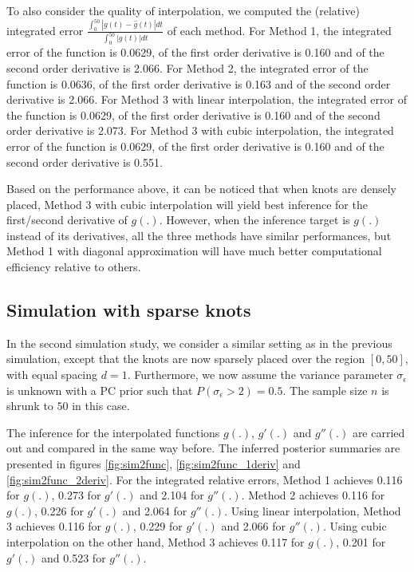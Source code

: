 \documentclass{article}
\begin{document}
To also consider the quality of interpolation, we computed the (relative) integrated error $\frac{\int_0^{50} |g(t) - \hat{g}(t)| dt}{\int_0^{50} |g(t)| dt}$ of each method. For Method 1, the integrated error of the function is 0.0629, of the first order derivative is 0.160 and of the second order derivative is 2.066. For Method 2, the integrated error of the function is 0.0636, of the first order derivative is 0.163 and of the second order derivative is 2.066. For Method 3 with linear interpolation, the integrated error of the function is 0.0629, of the first order derivative is 0.160 and of the second order derivative is 2.073. For Method 3 with cubic interpolation, the integrated error of the function is 0.0629, of the first order derivative is 0.160 and of the second order derivative is 0.551. 

Based on the performance above, it can be noticed that when knots are densely placed, Method 3 with cubic interpolation will yield best inference for the first/second derivative of $g(.)$. However, when the inference target is $g(.)$ instead of its derivatives, all the three methods have similar performances, but Method 1 with diagonal approximation will have much better computational efficiency relative to others.




\subsection{Simulation with sparse knots}

In the second simulation study, we consider a similar setting as in the previous simulation, except that the knots are now sparsely placed over the region $[0,50]$, with equal spacing $d = 1$. Furthermore, we now assume the variance parameter $\sigma_\epsilon$ is unknown with a PC prior such that $P(\sigma_\epsilon > 2) = 0.5$. The sample size $n$ is shrunk to $50$ in this case. 

The inference for the interpolated functions $g(.)$, $g'(.)$ and $g''(.)$ are carried out and compared in the same way before. The inferred posterior summaries are presented in figures \ref{fig:sim2func}, \ref{fig:sim2func_1deriv} and \ref{fig:sim2func_2deriv}. For the integrated relative errors, Method 1 achieves 0.116 for $g(.)$, 0.273 for $g'(.)$ and 2.104 for $g''(.)$. Method 2 achieves 0.116 for $g(.)$, 0.226 for $g'(.)$ and 2.064 for $g''(.)$. Using linear interpolation, Method 3 achieves 0.116 for $g(.)$, 0.229 for $g'(.)$ and 2.066 for $g''(.)$. Using cubic interpolation on the other hand, Method 3 achieves 0.117 for $g(.)$, 0.201 for $g'(.)$ and 0.523 for $g''(.)$.
\end{document}
